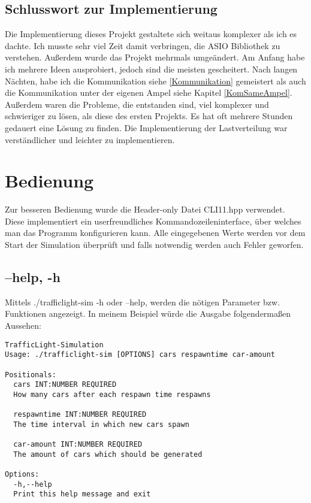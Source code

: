 \documentclass[12pt, oneside]{article}
\begin{document}
\subsection{Schlusswort zur Implementierung}
Die Implementierung dieses Projekt gestaltete sich weitaus komplexer als ich es dachte. Ich musste sehr viel Zeit damit verbringen, die ASIO Bibliothek zu verstehen. Außerdem wurde das Projekt mehrmals umgeändert. Am Anfang habe ich mehrere Ideen ausprobiert, jedoch sind die meisten gescheitert. Nach langen Nächten, habe ich die Kommunikation siehe \ref{Kommunikation} gemeistert als auch die Kommunikation unter der eigenen Ampel siehe Kapitel \ref{KomSameAmpel}. Außerdem waren die Probleme, die entstanden sind, viel komplexer und schwieriger zu lösen, als diese des ersten Projekts. Es hat oft mehrere Stunden gedauert eine Lösung zu finden. Die Implementierung der Lastverteilung war verständlicher und leichter zu implementieren. 

\newpage
\section{Bedienung}
\label{Bedienung}
Zur besseren Bedienung wurde die Header-only Datei CLI11.hpp verwendet. Diese implementiert ein userfreundliches Kommandozeileninterface, über welches man das Programm konfigurieren
kann. Alle eingegebenen Werte werden vor dem Start der Simulation überprüft und falls notwendig werden auch Fehler geworfen.

\subsection{--help, -h}
Mittels ./trafficlight-sim -h oder --help, werden die nötigen Parameter bzw. Funktionen angezeigt. In meinem Beispiel würde die Ausgabe folgendermaßen Aussehen:

\begin{lstlisting}[caption={Ausgabe - --help, -h}]
TrafficLight-Simulation
Usage: ./trafficlight-sim [OPTIONS] cars respawntime car-amount

Positionals:
  cars INT:NUMBER REQUIRED    
  How many cars after each respawn time respawns
                              
  respawntime INT:NUMBER REQUIRED
  The time interval in which new cars spawn
  
  car-amount INT:NUMBER REQUIRED
  The amount of cars which should be generated
                              
Options:
  -h,--help                 
  Print this help message and exit
\end{lstlisting}
\end{document}
